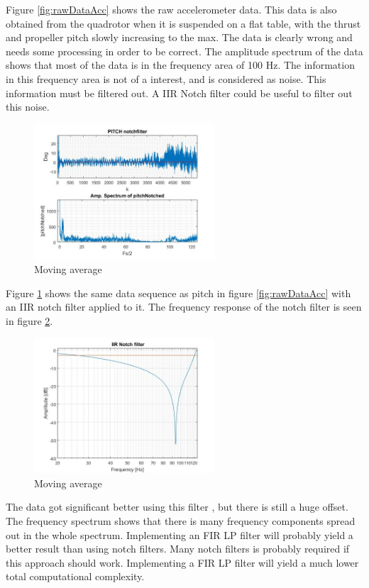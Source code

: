 Figure \ref{fig:rawDataAcc} shows the raw accelerometer data. This data is also obtained from the quadrotor when it is suspended on a flat table, with the thrust and propeller pitch slowly increasing to the max. The data is clearly wrong and needs some processing in order to be correct. The amplitude spectrum of the data shows that most of the data is in the frequency area of 100 Hz. The information in this frequency area is not of a interest, and is considered as noise. This information must be filtered out. A IIR Notch filter could be useful to filter out this noise. 
\begin{figure}[H]
    \centering
         \includegraphics[width = 0.6\textwidth]{NoisePictures/PitchNotchFilt.jpg}
      \caption{Moving average}
    \label{fig:pitchNotchedFig}
\end{figure} 
Figure \ref{fig:pitchNotchedFig} shows the same data sequence as pitch in figure \ref{fig:rawDataAcc} with an IIR notch filter applied to it. The frequency response of the notch filter is seen in figure \ref{fig:notchResp}.

\begin{figure}[H]
    \centering
         \includegraphics[width = 0.6\textwidth]{NoisePictures/NotchResp.jpg}
      \caption{Moving average}
    \label{fig:notchResp}
\end{figure} 

The data got significant better using this filter  , but there is still a huge offset. The frequency spectrum shows that there is many frequency components spread out in the whole spectrum. Implementing an FIR LP filter will probably yield a better result than using notch filters. Many notch filters is probably required if this approach should work. Implementing a FIR LP filter will yield a much lower total computational complexity.




